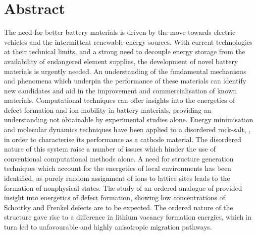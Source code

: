 \chapter*{Abstract}
The need for better battery materials is driven by the move towards electric vehicles and the intermittent renewable energy sources.
With current technologies at their technical limits, and a strong need to decouple energy storage from the availability of endangered element supplies, the development of novel battery materials is urgently needed.
An understanding of the fundamental mechanisms and phenomena which underpin the performance of these materials can identify new candidates and aid in the improvement and commercialisation of known materials.
Computational techniques can offer insights into the energetics of defect formation and ion mobility in battery materials, providing an understanding not obtainable by experimental studies alone.
Energy minimisation and molecular dynamics techniques have been applied to a disordered rock-salt, , in order to characterise its performance as a cathode material.
The disordered nature of this system raise a number of issues which hinder the use of conventional computational methods alone.
A need for structure generation techniques which account for the energetics of local environments has been identified, as purely random assignment of ions to lattice sites leads to the formation of nonphysical states.
The study of an ordered analogue of  provided insight into energetics of defect formation, showing low concentrations of Schottky and Frenkel defects are to be expected.
The ordered nature of the structure gave rise to a difference in lithium vacancy formation energies, which in turn led to unfavourable and highly anisotropic migration pathways.

